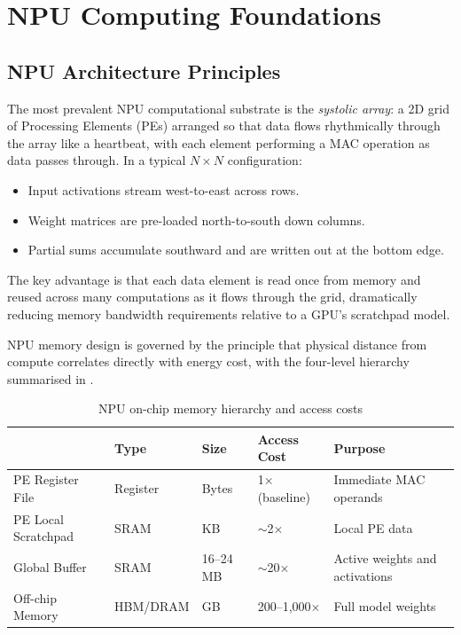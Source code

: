 
\section{NPU Computing Foundations}
\label{sec:npu-foundations}


\subsection{NPU Architecture Principles}
\label{subsec:npu-arch}


The most prevalent NPU computational substrate is the \textit{systolic array}:
a 2D grid of Processing Elements (PEs) arranged so that data flows
rhythmically through the array like a heartbeat, with each element
performing a MAC operation as data passes through. In a typical
$N \times N$ configuration:

\begin{itemize}
  \item Input activations stream west-to-east across rows.
  \item Weight matrices are pre-loaded north-to-south down columns.
  \item Partial sums accumulate southward and are written out at the bottom edge.
\end{itemize}

The key advantage is that each data element is read once from memory and
reused across many computations as it flows through the grid, dramatically
reducing memory bandwidth requirements relative to a GPU's scratchpad model.

NPU memory design is governed by the principle that physical distance from
compute correlates directly with energy cost, with the four-level hierarchy
summarised in .

\begin{table}[htbp]
  \centering
  \caption{NPU on-chip memory hierarchy and access costs}
  \label{tab:npu-memory}
  \begin{tabularx}{\textwidth}{lllXX}
    \toprule
    \tableheader{Level & Type & Size & Access Cost & Purpose} \\
    \midrule
    PE Register File & Register & Bytes  & 1$\times$ (baseline) & Immediate MAC operands \\
    \rowcolor{TableRowOdd}
    PE Local Scratchpad & SRAM   & KB     & $\sim$2$\times$      & Local PE data \\
    Global Buffer    & SRAM   & 16–24 MB & $\sim$20$\times$     & Active weights and activations \\
    \rowcolor{TableRowOdd}
    Off-chip Memory  & HBM/DRAM & GB    & 200–1,000$\times$   & Full model weights \\
    \bottomrule
  \end{tabularx}
\end{table}


